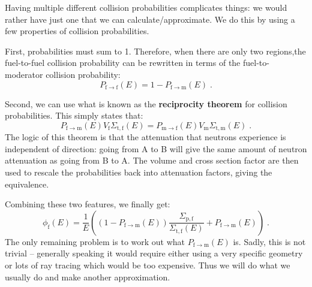 \documentclass{article}
\begin{document}
Having multiple different collision probabilities complicates things: we would rather have just one that we can calculate/approximate. We do this by using a few properties of collision probabilities.

First, probabilities must sum to 1. Therefore, when there are only two regions,the fuel-to-fuel collision probability can be rewritten in terms of the fuel-to-moderator collision probability:
\begin{equation}
    P_{\mathrm{f}\rightarrow\mathrm{f}}(E) = 1 - P_{\mathrm{f}\rightarrow\mathrm{m}}(E)\;\mathrm{.}
\end{equation}

Second, we can use what is known as the \textbf{reciprocity theorem} for collision probabilities. This simply states that:
\begin{equation}
    P_{\mathrm{f}\rightarrow\mathrm{m}}(E)V_\mathrm{f}\Sigma_{\mathrm{t,f}}(E) = P_{\mathrm{m}\rightarrow\mathrm{f}}(E)V_\mathrm{m}\Sigma_{\mathrm{t,m}}(E)\;\mathrm{.}
\end{equation}
The logic of this theorem is that the attenuation that neutrons experience is independent of direction: going from A to B will give the same amount of neutron attenuation as going from B to A. The volume and cross section factor are then used to rescale the probabilities back into attenuation factors, giving the equivalence.

Combining these two features, we finally get:
\begin{equation}\label{eq:f_to_m}
    \phi_\mathrm{f}(E) = \frac{1}{E}\left(\left(1-P_{\mathrm{f}\rightarrow\mathrm{m}}(E)\right)\frac{\Sigma_{\mathrm{p,f}}}{\Sigma_{\mathrm{t,f}}(E)} + P_{\mathrm{f}\rightarrow\mathrm{m}}(E)\right)\;\mathrm{.}
\end{equation}
The only remaining problem is to work out what $P_{\mathrm{f}\rightarrow\mathrm{m}}(E)$ is. Sadly, this is not trivial -- generally speaking it would require either using a very specific geometry or lots of ray tracing which would be too expensive. Thus we will do what we usually do and make another approximation.
\end{document}
